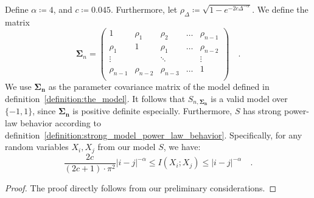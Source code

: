 \documentclass[../../main.tex]{subfiles}
\begin{document}
\begin{theorem}
    Define $\alpha \coloneqq 4$, and $c \coloneqq 0.045$. Furthermore, let $\rho_\Delta \coloneqq \sqrt{1 - e^{-2c \Delta^{-\alpha}}}$. We define the matrix
    \[
        \bm{\Sigma}_n = \begin{pmatrix*}
        1& \rho_1& \rho_2& \dots & \rho_{n-1} \\
        \rho_1& 1& \rho_1& \dots & \rho_{n-2} \\
        \vdots &  & \ddots & & \vdots \\
        \rho_{n-1} & \rho_{n-2} & \rho_{n-3} & \dots & 1 \\
    \end{pmatrix*} \quad .
    \]
    We use $\bm{\Sigma_n}$ as the parameter covariance matrix of the model defined in definition~\ref{definition:the_model}. It follows that $S_{n, \bm{\Sigma_n}}$ is a valid model over $\{-1, 1\}$, since $\bm{\Sigma_n}$ is positive definite especially. Furthermore, $S$ has strong power-law behavior according to definition~\ref{definition:strong_model_power_law_behavior}. Specifically, for any random variables $X_i, X_j$ from our model $S$, we have:
    \[
        \frac{2c}{(2c + 1) \cdot \pi^2} |i-j|^{-\alpha} \leq I(X_i; X_j) \leq |i-j|^{-\alpha} \quad .
    \]
\end{theorem}
\begin{proof}
    The proof directly follows from our preliminary considerations.
\end{proof}
\end{document}
